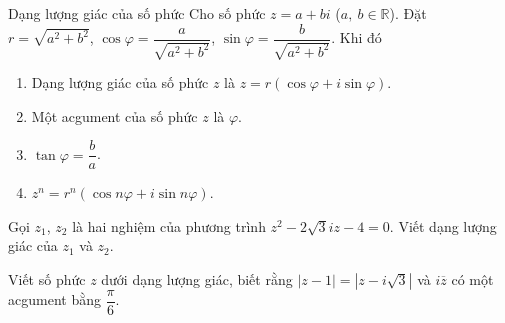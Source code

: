 \begin{ex}
\begin{dang}{Dạng lượng giác của số phức}
	Cho số phức $ z=a+bi $ ($ a,\ b\in\mathbb{R} $). Đặt $ r=\sqrt{a^{2}+b^{2}} $, $ \cos\varphi=\dfrac{a}{\sqrt{a^{2}+b^{2}}} $, $ \sin\varphi=\dfrac{b}{\sqrt{a^{2}+b^{2}}} $. Khi đó
	\begin{enumerate}
		\item Dạng lượng giác của số phức $ z $ là $ z=r(\cos\varphi+i\sin\varphi) $.
		\item Một acgument của số phức $ z $ là $ \varphi $.
		\item $ \tan\varphi=\dfrac{b}{a} $.
		\item $ z^{n}=r^{n}(\cos n\varphi+i\sin n\varphi) $.
	\end{enumerate}
\end{dang}
\begin{vd}[B-2012]%
	Gọi $ z_{1} $, $ z_{2} $ là hai nghiệm của phương trình $ z^{2}-2\sqrt{3}iz-4=0 $. Viết dạng lượng giác của $ z_{1} $ và $ z_{2} $.
\end{vd}
\begin{vd}%
	Viết số phức $ z $ dưới dạng lượng giác, biết rằng $ |z-1|=|z-i\sqrt{3}| $ và $ i\overline{z} $ có một acgument bằng $ \dfrac{\pi}{6} $.\\
\end{vd}
\end{ex}
